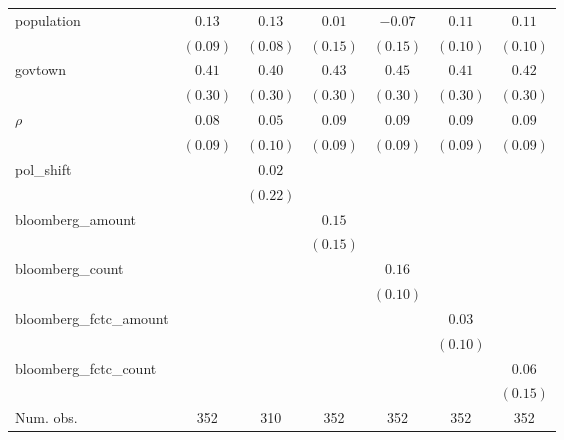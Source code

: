\begin{table}[!h]
\begin{center}
\begin{tabular}{l c c c c c c }
population              & $0.13$       & $0.13$       & $0.01$       & $-0.07$      & $0.11$       & $0.11$       \\
                        & $(0.09)$     & $(0.08)$     & $(0.15)$     & $(0.15)$     & $(0.10)$     & $(0.10)$     \\
govtown                 & $0.41$       & $0.40$       & $0.43$       & $0.45$       & $0.41$       & $0.42$       \\
                        & $(0.30)$     & $(0.30)$     & $(0.30)$     & $(0.30)$     & $(0.30)$     & $(0.30)$     \\
$\rho$                  & $0.08$       & $0.05$       & $0.09$       & $0.09$       & $0.09$       & $0.09$       \\
                        & $(0.09)$     & $(0.10)$     & $(0.09)$     & $(0.09)$     & $(0.09)$     & $(0.09)$     \\
pol\_shift              &              & $0.02$       &              &              &              &              \\
                        &              & $(0.22)$     &              &              &              &              \\
bloomberg\_amount       &              &              & $0.15$       &              &              &              \\
                        &              &              & $(0.15)$     &              &              &              \\
bloomberg\_count        &              &              &              & $0.16$       &              &              \\
                        &              &              &              & $(0.10)$     &              &              \\
bloomberg\_fctc\_amount &              &              &              &              & $0.03$       &              \\
                        &              &              &              &              & $(0.10)$     &              \\
bloomberg\_fctc\_count  &              &              &              &              &              & $0.06$       \\
                        &              &              &              &              &              & $(0.15)$     \\
\midrule
Num. obs.               & 352          & 310          & 352          & 352          & 352          & 352          \\

\end{tabular}
\end{center}
\end{table}
